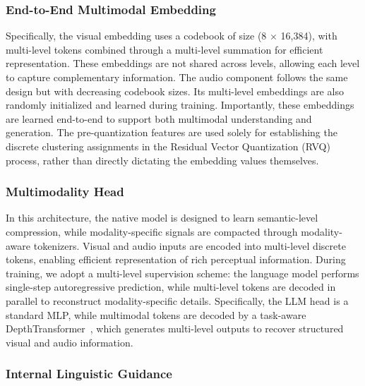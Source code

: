 \documentclass{article}
\begin{document}
\subsubsection{End-to-End Multimodal Embedding}

Specifically, the visual embedding uses a codebook of size (8 $\times$ 16,384), with multi-level tokens combined through a multi-level summation for efficient representation. These embeddings are not shared across levels, allowing each level to capture complementary information. 
The audio component follows the same design but with decreasing codebook sizes. Its multi-level embeddings are also randomly initialized and learned during training. 
Importantly, these embeddings are learned end-to-end to support both multimodal understanding and generation. The pre-quantization features are used solely for establishing the discrete clustering assignments in the Residual Vector Quantization (RVQ) process, rather than directly dictating the embedding values themselves.

\subsubsection{Multimodality Head}

In this architecture, the native model is designed to learn semantic-level compression, while modality-specific signals are compacted through modality-aware tokenizers. Visual and audio inputs are encoded into multi-level discrete tokens, enabling efficient representation of rich perceptual information. During training, we adopt a multi-level supervision scheme: the language model performs single-step autoregressive prediction, while multi-level tokens are decoded in parallel to reconstruct modality-specific details. Specifically, the LLM head is a standard MLP, while multimodal tokens are decoded by a task-aware DepthTransformer~\cite{rqvae}, which generates multi-level outputs to recover structured visual and audio information.



\subsubsection{Internal Linguistic Guidance}
\end{document}
